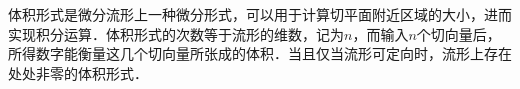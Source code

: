 



体积形式是微分流形上一种微分形式，可以用于计算切平面附近区域的大小，进而实现积分运算．体积形式的次数等于流形的维数，记为$n$，而输入$n$个切向量后，所得数字能衡量这几个切向量所张成的体积．当且仅当流形可定向时，流形上存在处处非零的体积形式．


























